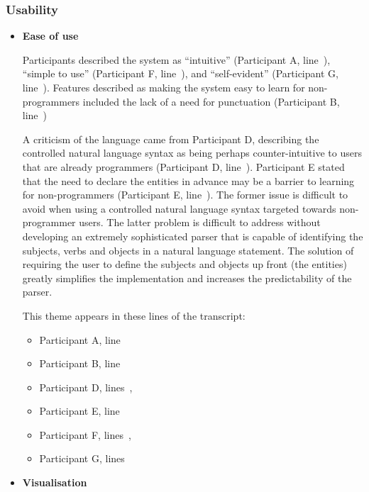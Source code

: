 \documentclass[11pt]{report}
\begin{document}
\subsubsection{Usability}
\begin{itemize}
\item \textbf{Ease of use}

Participants described the system as ``intuitive'' (Participant A,
line~), ``simple to use'' (Participant F,
line~), and ``self-evident'' (Participant G, line~). Features described as making the system easy to learn
for non-programmers included the lack of a need for punctuation (Participant B, line~)

A criticism of the language came from Participant D, describing the controlled
natural language syntax as being perhaps counter-intuitive to users that are already programmers (Participant D,
line~). Participant E stated that the need to declare the
entities in advance may be a barrier to learning for non-programmers
(Participant E, line~). The former issue is difficult to
avoid when using a controlled natural language syntax targeted towards
non-programmer users. The latter problem is difficult to address without
developing an extremely sophisticated parser that is capable of identifying the
subjects, verbs and objects in a natural language statement. The solution of
requiring the user to define the subjects and objects up front (the entities)
greatly simplifies the implementation and increases the predictability of the parser.

This theme appears in these lines of the transcript:

\begin{itemize}
\item Participant A, line~
\item Participant B, line~
\item Participant D, lines~,~
\item Participant E, line~
\item Participant F, lines~,~
\item Participant G, lines~
\end{itemize}

\item \textbf{Visualisation}


\end{itemize}
\end{document}
